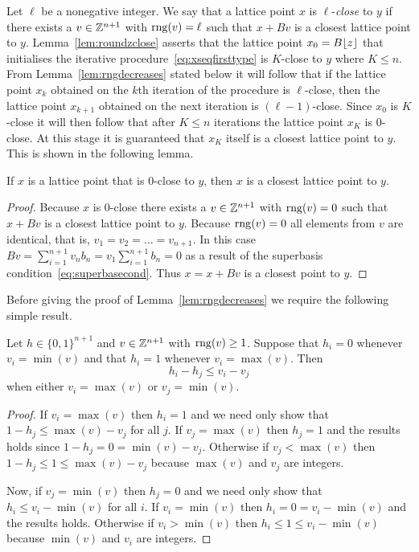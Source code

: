 \documentclass[final,leqno]{siamltex}
\begin{document}
Let $\ell$ be a nonegative integer.  We say that a lattice point $x$ is $\ell$-\emph{close} to $y$ if there exists a $v \in {\mathbb Z}^{n+1}$ with $\operatorname{rng}(v) = \ell$ such that $x + Bv$ is a closest lattice point to $y$.  Lemma~\ref{lem:roundzclose} asserts that the lattice point $x_0 = B{\left\lfloor z \right\rfloor}$ that initialises the iterative procedure~\eqref{eq:xseqfirsttype} is $K$-close to $y$ where $K \leq n$.  From Lemma~\ref{lem:rngdecreases} stated below it will follow that if the lattice point $x_k$ obtained on the $k$th iteration of the procedure is $\ell$-close, then the lattice point $x_{k+1}$ obtained on the next iteration is $(\ell-1)$-close.  Since $x_0$ is $K$-close it will then follow that after $K \leq n$ iterations the lattice point $x_K$ is $0$-close.  At this stage it is guaranteed that $x_{K}$ itself is a closest lattice point to $y$.  This is shown in the following lemma.  

\begin{lemma}\label{lem:rngzeroclosestpoint}
If $x$ is a lattice point that is $0$-close to $y$, then $x$ is a closest lattice point to $y$.
\end{lemma}
\begin{proof}
Because $x$ is $0$-close there exists a $v \in {\mathbb Z}^{n+1}$ with $\operatorname{rng}(v) = 0$ such that $x + Bv$ is a closest lattice point to $y$.  Because $\operatorname{rng}(v) = 0$ all elements from $v$ are identical, that is, $v_1=v_2=\dots=v_{n+1}$.  In this case $Bv = \sum_{i=1}^{n+1} v_n b_n = v_1\sum_{i=1}^{n+1}b_n = 0$
as a result of the superbasis condition~\eqref{eq:superbasecond}.  Thus $x = x + Bv$ is a closest point to $y$. 
\end{proof}

Before giving the proof of Lemma~\ref{lem:rngdecreases} we require the following simple result.

\begin{lemma}\label{eq:integergreaterless}
Let $h \in \{0,1\}^{n+1}$ and $v \in {\mathbb Z}^{n+1}$ with $\operatorname{rng}(v) \geq 1$.  Suppose that
$h_i = 0$ whenever $v_i = \min(v)$ and that $h_i = 1$ whenever $v_i = \max(v)$.  Then
\[
h_i - h_j \leq v_i - v_j
\]
when either $v_i = \max(v)$ or $v_j = \min(v)$.
\end{lemma}
\begin{proof}
If $v_i = \max(v)$ then $h_i = 1$ and we need only show that $1-h_j \leq \max(v) - v_j$ for all $j$.  If $v_j = \max(v)$ then $h_j = 1$ and the results holds since $1 - h_j = 0 = \min(v) - v_j$.  Otherwise if $v_j < \max(v)$ then $1-h_j \leq 1 \leq \max(v) - v_j$ because $\max(v)$ and $v_j$ are integers.

Now, if $v_j = \min(v)$ then $h_j = 0$ and we need only show that $h_i \leq v_i - \min(v)$ for all $i$.  If $v_i = \min(v)$ then $h_i = 0 = v_i - \min(v)$ and the results holds.  Otherwise if $v_i > \min(v)$ then $h_i \leq 1 \leq v_i - \min(v)$ because $\min(v)$ and $v_i$ are integers.
\end{proof}
\end{document}
